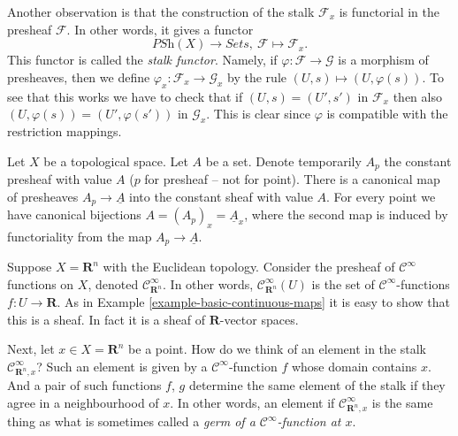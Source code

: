 \noindent
Another observation is that the construction of the stalk
$\mathcal{F}_x$ is functorial in the presheaf $\mathcal{F}$.
In other words, it gives a functor
$$
\textit{PSh}(X) \longrightarrow \textit{Sets},
\ \mathcal{F} \longmapsto \mathcal{F}_x.
$$
This functor is called the {\it stalk functor}.
Namely, if $\varphi : \mathcal{F} \to \mathcal{G}$ is
a morphism of presheaves, then we define
$\varphi_x : \mathcal{F}_x \to \mathcal{G}_x$
by the rule $(U, s) \mapsto (U, \varphi(s))$.
To see that this works we have to check that
if $(U, s) = (U', s')$ in $\mathcal{F}_x$ then also
$(U, \varphi(s)) = (U', \varphi(s'))$ in $\mathcal{G}_x$.
This is clear since $\varphi$ is compatible with the
restriction mappings.

\begin{example}
\label{example-stalk-constant-presheaf}
Let $X$ be a topological space. Let $A$ be a set.
Denote temporarily $A_p$ the constant presheaf
with value $A$ ($p$ for presheaf -- not for point).
There is a canonical map of presheaves
$A_p \to \underline{A}$ into the constant sheaf with
value $A$. For every point we have canonical
bijections $A = (A_p)_x = \underline{A}_x$, where
the second map is induced by functoriality from
the map $A_p \to \underline{A}$.
\end{example}



\begin{example}
\label{example-germs-functions}
Suppose $X = \mathbf{R}^n$ with the Euclidean topology.
Consider the presheaf of $\mathcal{C}^\infty$ functions
on $X$, denoted $\mathcal{C}^\infty_{\mathbf{R}^n}$.
In other words, $\mathcal{C}^\infty_{\mathbf{R}^n}(U)$ is the set
of $\mathcal{C}^\infty$-functions $f : U \to \mathbf{R}$.
As in Example \ref{example-basic-continuous-maps}
it is easy to show that this is a sheaf. In fact it
is a sheaf of $\mathbf{R}$-vector spaces.

\medskip\noindent
Next, let $x \in X = \mathbf{R}^n$ be a point. How do
we think of an element in the stalk $\mathcal{C}^\infty_{\mathbf{R}^n, x}$?
Such an element is given by a $\mathcal{C}^\infty$-function
$f$ whose domain contains $x$. And a pair of such
functions $f$, $g$ determine
the same element of the stalk if they agree in a neighbourhood
of $x$. In other words, an element if $\mathcal{C}^\infty_{\mathbf{R}^n, x}$
is the same thing as what is sometimes called
a {\it germ of a $\mathcal{C}^\infty$-function at $x$}.
\end{example}

